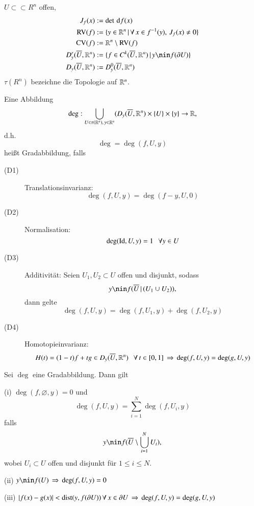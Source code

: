 $U\subset\subset R^n$ offen,
\begin{align*}
    J_f(x)&:=\det \d f(x)\\
    \RV(f)&:=\{ y\in \R^n \,| \, \forall \, x\in f^{-1}(y), \, J_f(x)\neq 0 \}\\
    \CV(f)&:= \R^n \setminus \RV(f)\\
    D_y^r(\ol U, \R^n)&:=\{f\in C^k(\ol U, \R^n)\,|\,y\nin f(\partial U)\}\\
    D_y(\ol U, \R^n)&:=D_y^0(\ol U, \R^n)
\end{align*}
$\tau(R^n)$ bezeichne die Topologie auf $\mathbb{R}^n$.
\begin{defi}
    Eine Abbildung
    \[
        \deg: \bigcup_{U\in \tau(\mathbb{R}^n),\, y\in \mathbb{R}^n} (D_y(\overline U, \mathbb{R}^n)\times \{U\}\times \{y\}\rightarrow \mathbb{R},
    \]
    d.h.
    \[
        \deg=\deg(f,U,y) 
    \]
    heißt Gradabbildung, falls
    \begin{description}
        \item[(D1)]
        Translationsinvarianz: 
        \[
            \deg(f,U,y)=\deg(f-y,U,0)
        \]
        \item[(D2)]
        Normalisation:
        \[
            \deg(\mathrm{Id},U,y)=1 \hspace{.25cm} \forall y\in U
        \]
        \item[(D3)]
        Additivität: Seien $U_1,U_2\subset U$ offen und disjunkt, sodass
        \[
            y\nin f(\ol U\,|\,(U_1\cup U_2)),
        \]
        dann gelte
        \[
            \deg(f,U,y)=\deg(f,U_1,y)+\deg(f,U_2,y)
        \]
        \item[(D4)]
        Homotopieinvarianz: 
        \[
            H(t)=(1-t)f+tg \in D_y(\overline U,\mathbb{R}^n) \hspace{.25cm} \forall \, t\in [0,1]\, \Rightarrow \, \deg(f,U,y)=\deg(g,U,y)
        \]
\end{description}
\end{defi}

\begin{theorem}\label{2.1}
    Sei $\deg$ eine Gradabbildung. Dann gilt
    \begin{description}
        \item{(i)}
        $\deg(f,\varnothing,y)=0$ und
        \[
            \deg(f,U,y)=\sum_{i=1}^N \deg(f,U_i,y)
        \]
        falls 
        \[
            y\nin f(\ol U\setminus\bigcup_{i=1}^NU_i),
        \]
        wobei $U_i\subset U$ offen und disjunkt für $1\leq i \leq N$.
        \item{(ii)}
        $y\nin f(U) \, \Ra \, \deg(f,U,y)=0$
        \item{(iii)}
        $|f(x)-g(x)|<\mathrm{dist}(y,f(\partial U)) \, \forall \, x\in \partial U \, \Rightarrow \, \deg(f,U,y)
        =\deg(g,U,y)$
    \end{description}
\end{theorem}


